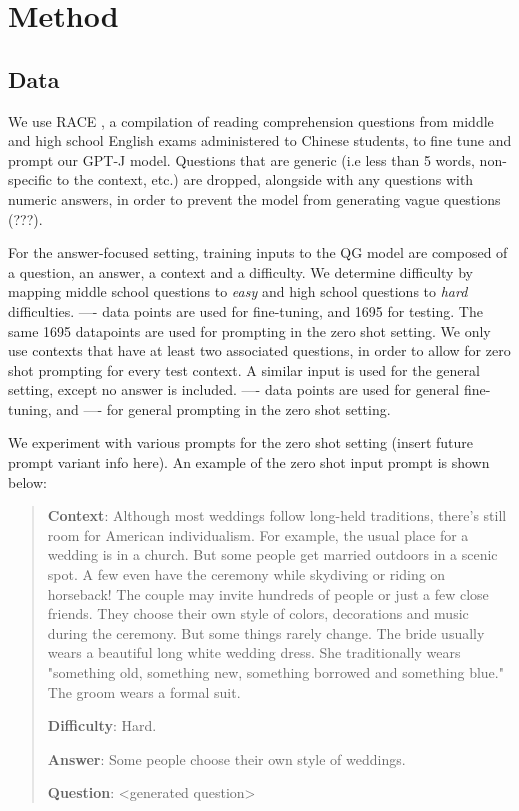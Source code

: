 \documentclass[11pt]{article}
\begin{document}
\section{Method}

\subsection{Data}

We use RACE \citep{RACE:2}, a compilation of reading comprehension questions from middle and high school English exams administered to Chinese students, to fine tune and prompt our GPT-J model. Questions that are generic (i.e less than 5 words, non-specific to the context, etc.) are dropped, alongside with any questions with numeric answers, in order to prevent the model from generating vague questions (???). 

For the answer-focused setting, training inputs to the QG model are composed of a question, an answer, a context and a difficulty. We determine difficulty by mapping middle school questions to \textit{easy} and high school questions to \textit{hard} difficulties.   ---- data points are used for fine-tuning, and 1695 for testing. The same 1695 datapoints are used for prompting in the zero shot setting. We only use contexts that have at least two associated questions, in order to allow for zero shot prompting for every test context. A similar input is used for the general setting, except no answer is included.  ---- data points are used for general fine-tuning, and ---- for general prompting in the zero shot setting. 

We experiment with various prompts for the zero shot setting (insert future prompt variant info here). An example of the zero shot input prompt is shown below: 

\begin{quote}
\textbf{Context}: Although most weddings follow long-held traditions, there's still room for American individualism. For example, the usual place for a wedding is in a church. But some people get married outdoors in a scenic spot. A few even have the ceremony while skydiving or riding on horseback! The couple may invite hundreds of people or just a few close friends. They choose their own style of colors, decorations and music during the ceremony. But some things rarely change. The bride usually wears a beautiful long white wedding dress. She traditionally wears "something old, something new, something borrowed and something blue." The groom wears a formal suit.

\textbf{Difficulty}: Hard. 

\textbf{Answer}: Some people choose their own style of weddings. 

\textbf{Question}: <generated question>

\end{quote}
\end{document}
